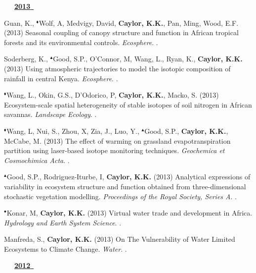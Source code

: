 \begin{etaremune}
\vspace{0.1in}
\mbox{\ \ \ \underline{\textbf{2013 }}}
\vspace{0.1in}

\item Guan, K., $^{\blacklozenge}$Wolf, A, Medvigy, David, \textbf{ Caylor, K.K.}, Pan, Ming, Wood, E.F. (2013) Seasonal coupling of canopy structure and function in African tropical forests and its environmental controls. \emph{Ecosphere}. .
\item Soderberg, K., $^{\blacktriangle}$Good, S.P., O'Connor, M, Wang, L., Ryan, K., \textbf{ Caylor, K.K.} (2013) Using atmospheric trajectories to model the isotopic composition of rainfall in central Kenya. \emph{Ecosphere}. .
\item $^{\blacklozenge}$Wang, L., Okin, G.S., D'Odorico, P, \textbf{ Caylor, K.K.}, Macko, S. (2013) Ecosystem-scale spatial heterogeneity of stable isotopes of soil nitrogen in African savannas. \emph{Landscape Ecology}. .
\item $^{\blacklozenge}$Wang, L, Nui, S., Zhou, X, Zia, J., Luo, Y., $^{\blacktriangle}$Good, S.P., \textbf{ Caylor, K.K.}, McCabe, M. (2013) The effect of warming on grassland evapotranspiration partition using laser-based isotope monitoring techniques. \emph{Geochemica et Cosmochimica Acta}. .
\item $^{\blacktriangle}$Good, S.P., Rodriguez-Iturbe, I, \textbf{ Caylor, K.K.} (2013) Analytical expressions of variability in ecosystem structure and function obtained from three-dimensional stochastic vegetation modelling. \emph{Proceedings of the Royal Society, Series A}. .
\item $^{\bullet}$Konar, M, \textbf{ Caylor, K.K.} (2013) Virtual water trade and development in Africa. \emph{Hydrology and Earth System Science}. .
\item Manfreda, S., \textbf{ Caylor, K.K.} (2013) On The Vulnerability of Water Limited Ecosystems to Climate Change. \emph{Water}. .

\vspace{0.1in}
\mbox{\ \ \ \underline{\textbf{2012 }}}
\vspace{0.1in}


\end{etaremune}

